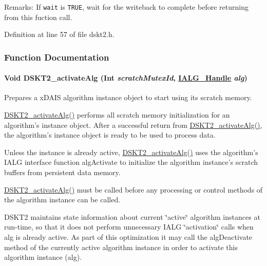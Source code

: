 \begin{Desc}
\item[Remarks:]If {\tt wait} is {\tt TRUE}, wait for the writeback to complete before returning from this fuction call. \end{Desc}


Definition at line 57 of file dskt2.h.

\subsubsection{Function Documentation}
\hypertarget{group___d_s_p_d_s_k_t2_gf946d426d6d9a95040d3967fa746cd7a}{
\paragraph[DSKT2\_\-activateAlg]{\setlength{\rightskip}{0pt plus 5cm}Void DSKT2\_\-activate\-Alg (Int {\em scratch\-Mutex\-Id}, \hyperlink{struct_i_a_l_g___obj}{IALG\_\-Handle} {\em alg})}\hfill}
\label{group___d_s_p_d_s_k_t2_gf946d426d6d9a95040d3967fa746cd7a}


Prepares a x\-DAIS algorithm instance object to start using its scratch memory. 

\hyperlink{group___d_s_p_d_s_k_t2_gf946d426d6d9a95040d3967fa746cd7a}{DSKT2\_\-activate\-Alg()} performs all scratch memory initialization for an algorithm's instance object. After a successful return from \hyperlink{group___d_s_p_d_s_k_t2_gf946d426d6d9a95040d3967fa746cd7a}{DSKT2\_\-activate\-Alg()}, the algorithm's instance object is ready to be used to process data.

Unless the instance is already active, \hyperlink{group___d_s_p_d_s_k_t2_gf946d426d6d9a95040d3967fa746cd7a}{DSKT2\_\-activate\-Alg()} uses the algorithm's IALG interface function alg\-Activate to initialize the algorithm instance's scratch buffers from persistent data memory.

\hyperlink{group___d_s_p_d_s_k_t2_gf946d426d6d9a95040d3967fa746cd7a}{DSKT2\_\-activate\-Alg()} must be called before any processing or control methods of the algorithm instance can be called.

DSKT2 maintains state information about current \char`\"{}active\char`\"{} algorithm instances at run-time, so that it does not perform unnecessary IALG \char`\"{}activation\char`\"{} calls when alg is already active. As part of this optimization it may call the alg\-Deactivate method of the currently active algorithm instance in order to activate this algorithm instance (alg).

